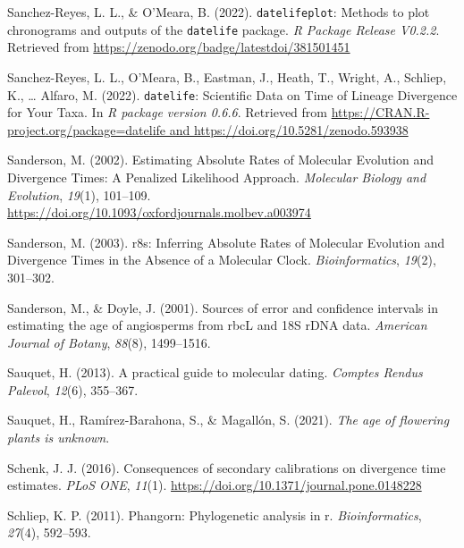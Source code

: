 \documentclass[english,man]{apa6}
\begin{document}
\leavevmode\hypertarget{ref-datelifeplot}{}%
Sanchez-Reyes, L. L., \& O'Meara, B. (2022). \texttt{datelifeplot}: Methods to plot chronograms and outputs of the \texttt{datelife} package. \emph{R Package Release V0.2.2}. Retrieved from \url{https://zenodo.org/badge/latestdoi/381501451}

\leavevmode\hypertarget{ref-sanchez2022}{}%
Sanchez-Reyes, L. L., O'Meara, B., Eastman, J., Heath, T., Wright, A., Schliep, K., \ldots{} Alfaro, M. (2022). \texttt{datelife}: Scientific Data on Time of Lineage Divergence for Your Taxa. In \emph{R package version 0.6.6}. Retrieved from \href{https://CRAN.R-project.org/package=datelife\%20and\%20https://doi.org/10.5281/zenodo.593938}{https://CRAN.R-project.org/package=datelife and https://doi.org/10.5281/zenodo.593938}

\leavevmode\hypertarget{ref-sanderson2002}{}%
Sanderson, M. (2002). Estimating Absolute Rates of Molecular Evolution and Divergence Times: A Penalized Likelihood Approach. \emph{Molecular Biology and Evolution}, \emph{19}(1), 101--109. \url{https://doi.org/10.1093/oxfordjournals.molbev.a003974}

\leavevmode\hypertarget{ref-sanderson2003r8s}{}%
Sanderson, M. (2003). r8s: Inferring Absolute Rates of Molecular Evolution and Divergence Times in the Absence of a Molecular Clock. \emph{Bioinformatics}, \emph{19}(2), 301--302.

\leavevmode\hypertarget{ref-sanderson2001sources}{}%
Sanderson, M., \& Doyle, J. (2001). Sources of error and confidence intervals in estimating the age of angiosperms from rbcL and 18S rDNA data. \emph{American Journal of Botany}, \emph{88}(8), 1499--1516.

\leavevmode\hypertarget{ref-sauquet2013practical}{}%
Sauquet, H. (2013). A practical guide to molecular dating. \emph{Comptes Rendus Palevol}, \emph{12}(6), 355--367.

\leavevmode\hypertarget{ref-sauquet2021age}{}%
Sauquet, H., Ramírez-Barahona, S., \& Magallón, S. (2021). \emph{The age of flowering plants is unknown}.

\leavevmode\hypertarget{ref-schenk2016sec}{}%
Schenk, J. J. (2016). Consequences of secondary calibrations on divergence time estimates. \emph{PLoS ONE}, \emph{11}(1). \url{https://doi.org/10.1371/journal.pone.0148228}

\leavevmode\hypertarget{ref-schliep2011phangorn}{}%
Schliep, K. P. (2011). Phangorn: Phylogenetic analysis in r. \emph{Bioinformatics}, \emph{27}(4), 592--593.
\end{document}
